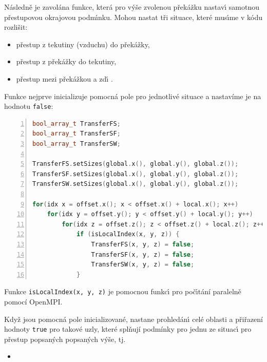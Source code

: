         N\'{a}sledn\v{e} je zavol\'{a}na funkce, kter\'{a} pro v\'{y}\v{s}e zvolenou p\v{r}ek\'{a}\v{z}ku nastav\'{\i} samotnou p\v{r}estupovou okrajovou podm\'{\i}nku. Mohou nastat t\v{r}i situace, kter\'{e} mus\'{\i}me v k\'{o}du rozli\v{s}it: 
        \begin{itemize}
            \item p\v{r}estup z tekutiny (vzduchu) do p\v{r}ek\'{a}\v{z}ky,
            \item p\v{r}estup z p\v{r}ek\'{a}\v{z}ky do tekutiny,
            \item p\v{r}estup mezi p\v{r}ek\'{a}\v{z}kou a zd\'{\i} .
        \end{itemize}

        Funkce nejprve inicializuje pomocn\'{a} pole pro jednotliv\'{e} situace a nastav\'{i}me je na hodnotu \texttt{\lstinline{false}}:

        \begin{lstlisting}[frame=single, backgroundcolor=\color{light-gray}, commentstyle=\color{codegray}, basicstyle=\footnotesize\ttfamily, language=C++, numbers=left, numberstyle=\tiny\color{black}]
bool_array_t TransferFS;
bool_array_t TransferSF;
bool_array_t TransferSW;

TransferFS.setSizes(global.x(), global.y(), global.z());
TransferSF.setSizes(global.x(), global.y(), global.z());
TransferSW.setSizes(global.x(), global.y(), global.z());

for(idx x = offset.x(); x < offset.x() + local.x(); x++)
    for(idx y = offset.y(); y < offset.y() + local.y(); y++)
        for(idx z = offset.z(); z < offset.z() + local.z(); z++)
            if (isLocalIndex(x, y, z)) {
                TransferFS(x, y, z) = false;
                TransferSF(x, y, z) = false;
                TransferSW(x, y, z) = false;
            }			    
\end{lstlisting}

        Funkce \texttt{\lstinline{isLocalIndex(x, y, z)}} je pomocnou funkc\'{\i} pro po\v{c}\'{\i}t\'{a}n\'{i} paraleln\v{e} pomoc\'{i} OpenMPI.

        Kdy\v{z} jsou pomocn\'{a} pole inicializovan\'{e}, nastane prohled\'{a}n\'{\i} cel\'{e} oblasti a p\v{r}i\v{r}azen\'{i} hodnoty \texttt{\lstinline{true}} pro takov\'{e} uzly, kter\'{e} spl\v{n}uj\'{i} podm\'{i}nky pro jednu ze situac\'{\i} pro p\v{r}estup popsan\'{y}ch popsan\'{y}ch v\'{y}\v{s}e, tj.
        
        \begin{itemize}
            \item 
        \end{itemize}

